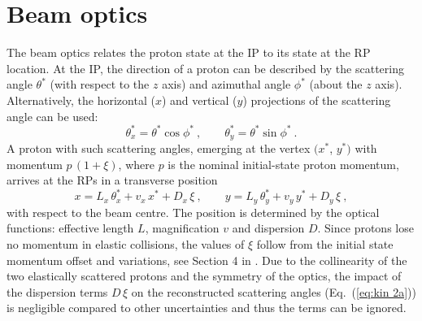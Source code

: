 \section{Beam optics}
\label{sec:beam optics}
%
The beam optics relates the proton state at the IP to its state at the RP location. At the IP, the direction of a proton can be described by the scattering angle $\theta^*$ (with respect to the $z$ axis) and azimuthal angle $\phi^*$ (about the $z$ axis). Alternatively, the horizontal ($x$) and vertical ($y$) projections of the scattering angle can be used:
\begin{equation}
\label{eq:scatt angle}
\theta_x^* = \theta^* \cos\phi^*\ ,\qquad \theta_y^* = \theta^* \sin\phi^*\ .
\end{equation}
A proton with such scattering angles, emerging at the vertex $(x^*$, $y^*)$ with momentum $p\,(1+\xi)$, where $p$ is the nominal initial-state proton momentum, arrives at the RPs in a transverse position
\begin{equation}
\label{eq:prot trans}
	x = L_x\, \theta_x^* + v_x\, x^* + D_x\, \xi\ ,\qquad y = L_y\, \theta_y^* + v_y\, y^* + D_y\, \xi\ ,
\end{equation}
with respect to the beam centre. The position is determined by the optical functions: effective length $L$, magnification $v$ and dispersion $D$. Since protons lose no momentum in elastic collisions, the values of $\xi$ follow from the initial state momentum offset and variations, see Section 4 in \cite{8tev-90m}. Due to the collinearity of the two elastically scattered protons and the symmetry of the optics, the impact of the dispersion terms $D\,\xi$ on the reconstructed scattering angles (Eq.~(\ref{eq:kin 2a})) is negligible compared to other uncertainties and thus the terms can be ignored.

